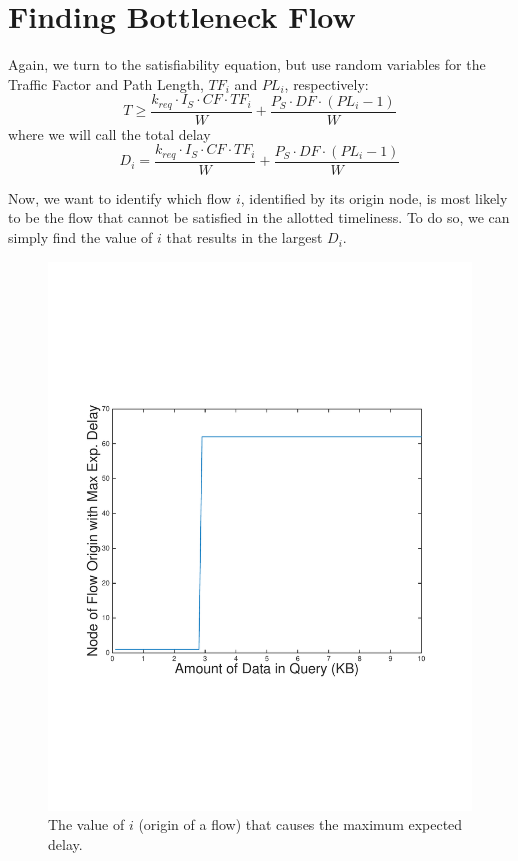 \section{Finding Bottleneck Flow}
\label{sec:bottleneck}

Again, we turn to the satisfiability equation, but use random variables for the Traffic Factor and Path Length, $TF_i$ and $PL_i$, respectively:
\begin{equation}
	T \geq \frac{ k_{req} \cdot I_S \cdot CF \cdot TF_i}{W} + \frac{P_S \cdot DF \cdot (PL_i-1)}{W}
\end{equation}
where we will call the total delay
\begin{equation}
	D_i = \frac{ k_{req} \cdot I_S \cdot CF \cdot TF_i}{W} + \frac{P_S \cdot DF \cdot (PL_i-1)}{W}
\end{equation}

Now, we want to identify which flow $i$, identified by its origin node, is most likely to be the flow that cannot be satisfied in the allotted timeliness.  To do so, we can simply find the value of $i$ that results in the largest $D_i$.

\begin{figure}
\begin{centering}
    \includegraphics[scale=0.4, clip=true, trim=15mm 65mm 20mm 65mm]{figures/max_i_line_net_125.pdf}
    \caption{The value of $i$ (origin of a flow) that causes the maximum expected delay.}
    \label{fig:max_i_line_net}
\end{centering}
\end{figure}

